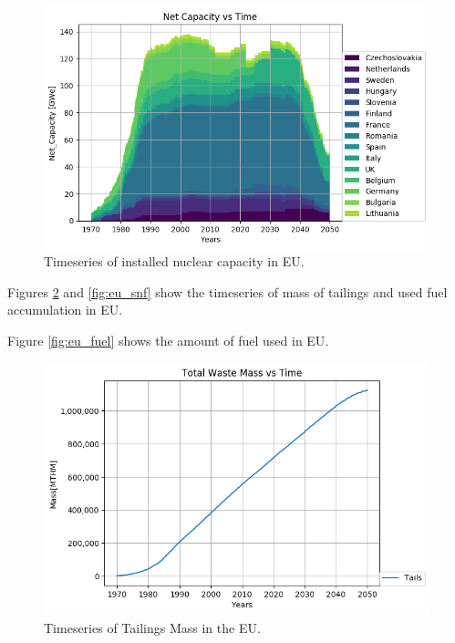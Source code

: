 		\begin{figure}[htbp!]
			\begin{center}
				\includegraphics[width=\columnwidth]{./images/eu_future/power_plot.png}
			\end{center}
			\caption{Timeseries of installed nuclear capacity in \gls{EU}.}
			\label{fig:eu_pow}
		\end{figure}
		\FloatBarrier
		
		
		Figures \ref{fig:eu_tail} and \ref{fig:eu_snf} show the 
		timeseries of mass of tailings and used fuel accumulation in \gls{EU}.
		
		Figure \ref{fig:eu_fuel} shows the amount of fuel used in \gls{EU}.
		
		
		\begin{figure}[htbp!]
			\begin{center}
				\includegraphics[width=\columnwidth]{./images/eu_future/tailings.png}
			\end{center}
			\caption{Timeseries of Tailings Mass in the \gls{EU}.}
			\label{fig:eu_tail}
		\end{figure}
		
